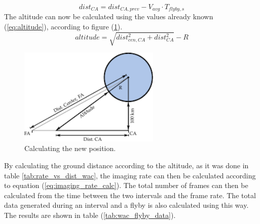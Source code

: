 \begin{equation}\label{eq:fa_to_ca}
dist_{CA} = dist_{CA,prev}-V_{avg}\cdot T_{flyby,s}
\end{equation}
The altitude can now be calculated using the values already known (\ref{eq:altitude}), according to figure (\ref{fig:linear_flyby_move}).
\begin{equation}\label{eq:altitude}
altitude = \sqrt{dist_{cen,CA}^2+dist_{CA}^2}-R
\end{equation}
\begin{figure}[htb]
\centering
\includegraphics[width=0.6\textwidth]{figures/Orbiter/linear_flyby_move.pdf}
\caption{Calculating the new position.}
\label{fig:linear_flyby_move}
\end{figure}
By calculating the ground distance according to the altitude, as it was done in table \ref{tab:rate_vs_dist_wac}, the imaging rate can then be calculated according to equation (\ref{eq:imaging_rate_calc}). The total number of frames can then be calculated from the time between the two intervals and the frame rate. The total data generated during an interval and a flyby is also calculated using this way. The results are shown in table (\ref{tab:wac_flyby_data}).
